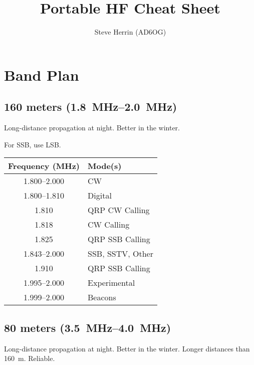 \documentclass[11pt, onecolumn, table]{article}
\begin{document}
\title{Portable HF Cheat Sheet}
\author{Steve Herrin (AD6OG)}
\date{}
\maketitle
\newpage



\section{Band Plan}


\subsection{160 meters (\SIrange{1.8}{2.0}{\MHz})}
Long-distance propagation at night. Better in the winter.

For SSB, use LSB.
\begin{center}
  \begin{tabular}{S l}
    {Frequency (\si{\MHz})}	& Mode(s)			\\
    \midrule
    \numrange{1.800}{2.000}	& CW				\\
    \numrange{1.800}{1.810}	& Digital			\\
    \num{1.810}				& QRP CW Calling	\\
    \num{1.818}				& CW Calling		\\
    \num{1.825}				& QRP SSB Calling	\\
    \numrange{1.843}{2.000}	& SSB, SSTV, Other	\\
    \num{1.910}				& QRP SSB Calling	\\
    \numrange{1.995}{2.000}	& Experimental		\\
    \numrange{1.999}{2.000}	& Beacons			\\
  \end{tabular}
\end{center}


\subsection{80 meters (\SIrange{3.5}{4.0}{\MHz})}
Long-distance propagation at night. Better in the winter.
Longer distances than \SI{160}{\m}. Reliable.
\end{document}
